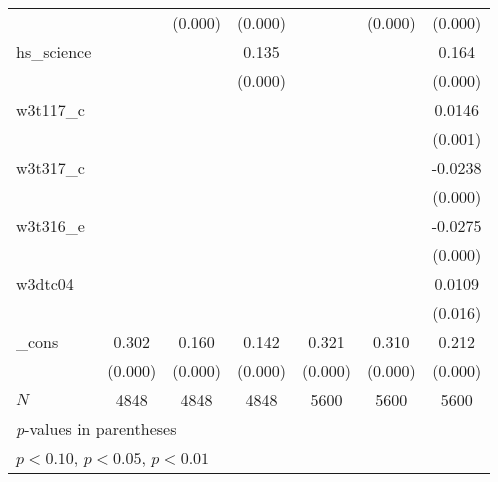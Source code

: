 {\begin{tabular}{l*{6}{c}}
            &                     &     (0.000)         &     (0.000)         &                     &     (0.000)         &     (0.000)         \\
[1em]
hs\_science  &                     &                     &       0.135\sym{***}&                     &                     &       0.164\sym{***}\\
            &                     &                     &     (0.000)         &                     &                     &     (0.000)         \\
[1em]
w3t117\_c    &                     &                     &                     &                     &                     &      0.0146\sym{***}\\
            &                     &                     &                     &                     &                     &     (0.001)         \\
[1em]
w3t317\_c    &                     &                     &                     &                     &                     &     -0.0238\sym{***}\\
            &                     &                     &                     &                     &                     &     (0.000)         \\
[1em]
w3t316\_e    &                     &                     &                     &                     &                     &     -0.0275\sym{***}\\
            &                     &                     &                     &                     &                     &     (0.000)         \\
[1em]
w3dtc04     &                     &                     &                     &                     &                     &      0.0109\sym{**} \\
            &                     &                     &                     &                     &                     &     (0.016)         \\
[1em]
\_cons      &       0.302\sym{***}&       0.160\sym{***}&       0.142\sym{***}&       0.321\sym{***}&       0.310\sym{***}&       0.212\sym{***}\\
            &     (0.000)         &     (0.000)         &     (0.000)         &     (0.000)         &     (0.000)         &     (0.000)         \\
\hline
\(N\)       &        4848         &        4848         &        4848         &        5600         &        5600         &        5600         \\
\hline\hline
\multicolumn{7}{l}{\footnotesize \textit{p}-values in parentheses}\\
\multicolumn{7}{l}{\footnotesize \sym{*} \(p<0.10\), \sym{**} \(p<0.05\), \sym{***} \(p<0.01\)}\\
\end{tabular}
}
